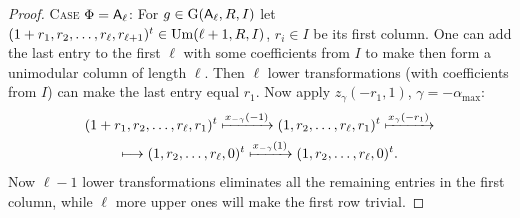 \begin{proof}
\textsc{Case $\Phi=\mathsf{A}_\ell$:}
For $g\in\operatorname{G}(\mathsf{A}_\ell,R,I)$ let $(1+r_1,r_2,\ldots,r_\ell,r_{\ell+1})^t\in\operatorname{Um}(\ell+1,R,I)$, $r_i\in I$ be its first column. One can add the last entry to the first $\ell$ with some coefficients from $I$ to make then form a unimodular column of length $\ell$. Then $\ell$ lower transformations (with coefficients from $I$) can make the last entry equal $r_1$. Now apply $z_\gamma(-r_1,1)$, $\gamma=-\alpha_{\max}$:
\begin{multline*}
(1+r_1,r_2,\ldots,r_\ell,r_1)^t\xmapsto{x_{-\gamma}(-1)}(1,r_2,\ldots,r_\ell,r_1)^t\xmapsto{x_\gamma(-r_1)}\\\longmapsto(1,r_2,\ldots,r_\ell,0)^t\xmapsto{x_{-\gamma}(1)}(1,r_2,\ldots,r_\ell,0)^t.
\end{multline*}
Now $\ell-1$ lower transformations eliminates all the remaining entries in the first column, while $\ell$ more upper ones will make the first row trivial.


\end{proof}
